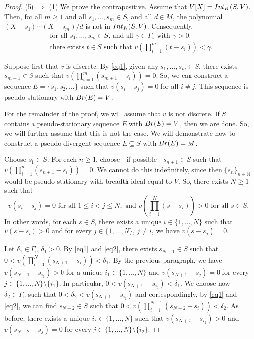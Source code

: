 \documentclass{article}
\theoremstyle{definition}\newtheorem{Def}[equation]{Definition}
\theoremstyle{definition}\newtheorem{Ques}[equation]{Question}
\theoremstyle{definition}\newtheorem{Conj}[equation]{Conjecture}
\theoremstyle{definition}\newtheorem{Not}[equation]{Notation}
\newcommand{\N}{\mathbb{N}}
\newcommand{\Int}{\textnormal{Int}}
\newcommand{\Br}{\textnormal{Br}}
\numberwithin{equation}{section}
\begin{document}
\begin{proof}
(5) $\Rightarrow$ (1) We prove the contrapositive. Assume that $V[X] = \Int_K(S,V)$. Then, for all $m \geq 1$ and all $s_1, \ldots, s_m \in S$, and all $d \in M$, the polynomial $(X-s_1) \cdots (X-s_m)/d$ is not in $\Int_K(S,V)$. Consequently,
\begin{equation}\label{eq1}
\begin{aligned}
&\text{for all $s_1,\ldots,s_m \in S$, and all $\gamma \in \Gamma_v$ with $\gamma > 0$,}\\
&\text{there exists $t \in S$ such that $v(\textstyle\prod_{i=1}^m(t-s_i)) < \gamma$.}
\end{aligned}
\end{equation}

Suppose first that $v$ is discrete. By \eqref{eq1}, given any $s_1, \ldots, s_m \in S$, there exists $s_{m+1} \in S$ such that $v(\prod_{i=1}^m(s_{m+1}-s_i))=0$. So, we can construct a sequence $E = \{s_1, s_2, \ldots \}$ such that $v(s_i-s_j)=0$ for all $i \ne j$. This sequence is pseudo-stationary with $\Br(E)=V$.

For the remainder of the proof, we will assume that $v$ is not discrete. If $S$ contains a pseudo-stationary sequence $E$ with $\Br(E)=V$, then we are done. So, we will further assume that this is not the case. We will demonstrate how to construct a pseudo-divergent sequence $E \subseteq S$ with $\Br(E)=M$.

Choose $s_1 \in S$. For each $n \geq 1$, choose---if possible---$s_{n+1} \in S$ such that $v(\prod_{i=1}^n(s_{n+1}-s_i))=0$. We cannot do this indefinitely, since then $\{s_n\}_{n \in \N}$ would be pseudo-stationary with breadth ideal equal to $V$. So, there exists $N \geq 1$ such that 
\begin{equation}\label{eq2}
v(s_i-s_j) = 0 \text{ for all } 1 \leq i < j \leq N, \text{ and } v(\textstyle\prod_{i=1}^N (s - s_i)) > 0 \text{ for all } s \in S.
\end{equation}
In other words, for each $s\in S$, there exists a unique $i\in\{1,\ldots,N\}$ such that $v(s-s_i)>0$ and for every $j\in\{1,\ldots,N\}$, $j\not=i$, we have $v(s-s_j)=0$.


Let $\delta_1\in\Gamma_v,\delta_1>0$. By \eqref{eq1} and \eqref{eq2}, there exists $s_{N+1} \in S$ such that $0 < v(\prod_{i=1}^N(s_{N+1}-s_i)) < \delta_1$. By the previous paragraph, we have $v(s_{N+1}-s_{i_1}) > 0$ for a unique $i_1 \in \{1,\ldots,N\}$ and $v(s_{N+1}-s_j)=0$ for every $j \in \{1,\ldots,N\} \setminus \{i_1\}$. In particular, $0 < v(s_{N+1}-s_{i_1}) < \delta_1$. We choose now $\delta_2 \in \Gamma_v$ such that $0 < \delta_2 < v(s_{N+1}-s_{i_1})$ and correspondingly, by \eqref{eq1} and \eqref{eq2}, we can find $s_{N+2}\in S$ such that $0 < v(\prod_{i=1}^{N+1}(s_{N+2}-s_i)) < \delta_2$. As before, there exists a unique $i_2\in\{1,\ldots,N\}$ such that $v(s_{N+2}-s_{i_2})>0$ and $v(s_{N+2}-s_j)=0$ for every $j\in\{1,\ldots,N\}\setminus\{i_2\}$. 


\end{proof}
\end{document}
